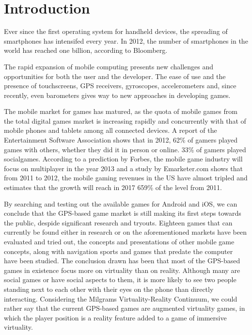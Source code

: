 \section{Introduction}

Ever since the first operating system for handheld devices, the spreading of
smartphones has intensifed every year. In 2012, the number of smartphones in the
world has reached one billion, according to Bloomberg\cite{bloomberg}. \newline

The rapid expansion of mobile computing presents new challenges and
opportunities for both the user and the developer. The ease of use and the
presence of touchscreens, GPS receivers, gyroscopes, accelerometers and, since
recently, even barometers gives way to new approaches in developing
games.\newline

The mobile market for games has matured, as the quota of mobile games from the
total digital games market is increasing rapidly and concurrently with that of
mobile phones and tablets among all connected devices. A report of the
Entertainment Software Association shows that in 2012, 62\% of gamers played
games with others, whether they did it in person or online. 33\% of gamers
played socialgames\cite{esa}. According to a prediction by Forbes, the mobile
game industry will focus on multiplayer in the year 2013\cite{forbes}
and a study by Emarketer.com shows that from 2011 to 2012, the mobile
gaming revenues in the US have almost tripled and estimates that the
growth will reach in 2017 659\% of the level from 2011\cite{emarketer}.\newline

By searching and testing out the available games for Android and iOS, we can
conclude that the GPS-based game market is still making its first steps towards
the public, despide significant research and tryouts. Eighteen games that can
currently be found either in research or on the aforementioned markets have been
evaluated and tried out, the concepts and presentations of other mobile game
concepts, along with navigation sports and games that predate the computer have
been studied. The conclusion drawn has been that most of the GPS-based games in
existence focus more on virtuality than on reality. Although many are social
games or have social aspects to them, it is more likely to see two people
standing next to each other with their eyes on the phone than directly
interacting. Considering the Milgrams Virtuality-Reality Continuum, we could
rather say that the current GPS-based games are augmented virtuality games, in
which the player position is a reality feature added to a game of immersive
virtuality.\newline

